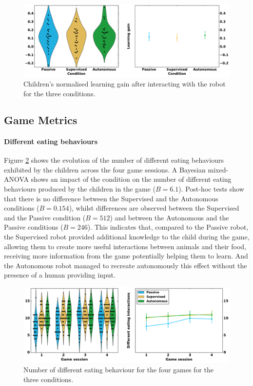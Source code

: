 \begin{figure}[ht]
	\includegraphics[width=1\linewidth]{learning.pdf}
	\centering
	\caption{Children's normalised learning gain after interacting with the robot for the three conditions.}
	\label{fig:tutoring_learning}
\end{figure}

\subsection{Game Metrics}

\paragraph{Different eating behaviours}
Figure \ref{fig:tutoring_d_eat} shows the evolution of the number of different eating behaviours exhibited by the children across the four game sessions. A Bayesian mixed-ANOVA shows an impact of the condition on the number of different eating behaviours produced by the children in the game ($B=6.1$). Post-hoc tests show that there is no difference between the Supervised and the Autonomous conditions ($B=0.154$), whilst differences are observed between the Supervised and the Passive condition ($B=512$) and between the Autonomous and the Passive conditions ($B=246$). This indicates that, compared to the Passive robot, the Supervised robot provided additional knowledge to the child during the game, allowing them to create more useful interactions between animals and their food, receiving more information from the game potentially helping them to learn. And the Autonomous robot managed to recreate autonomously this effect without the presence of a human providing input.

\begin{figure}[ht]
	\includegraphics[width=1\linewidth]{d_eat.pdf}
	\centering
	\caption{Number of different eating behaviour for the four games for the three conditions.}
	\label{fig:tutoring_d_eat}
\end{figure}

